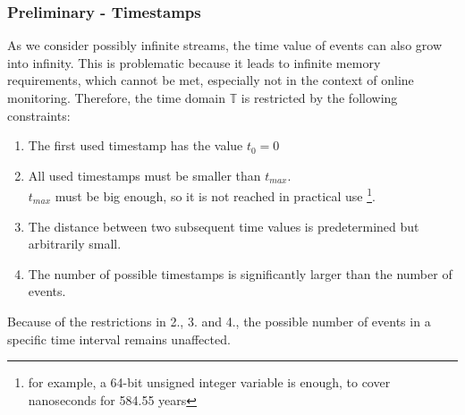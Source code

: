 	\subsubsection{Preliminary - Timestamps}
		\label{monitorability_timestamps}
		As we consider possibly infinite streams, the time value of events can also grow into infinity. This is problematic because it leads to infinite memory requirements, which cannot be met, especially not in the context of online monitoring. Therefore, the time domain $\mathbb{T}$ is restricted by the following constraints:
		\begin{enumerate}[1.]
			\item
				The first used timestamp has the value $t_0=0$
			\item
				All used timestamps must be smaller than $t_{max}$.\\
				$t_{max}$ must be big enough, so it is not reached in practical use \footnote{for example, a 64-bit unsigned integer variable is enough, to cover nanoseconds for 584.55 years}.
			\item
				The distance between two subsequent time values is predetermined but arbitrarily small.
			\item
				The number of possible timestamps is significantly larger than the number of events.
		\end{enumerate}
	Because of the restrictions in 2., 3. and 4., the possible number of events in a specific time interval remains unaffected.

